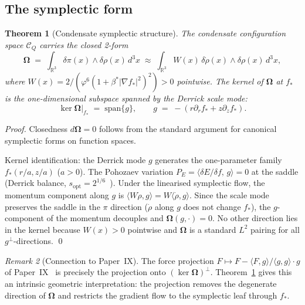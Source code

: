 \documentclass[11pt,a4paper]{article}
\newtheorem{theorem}{Theorem}[section]
\theoremstyle{definition}
\theoremstyle{remark}
\newtheorem{remark}[theorem]{Remark}
\newcommand{\vp}{\varphi}
\newcommand{\bst}{\beta^{*}}
\newcommand{\sopt}{s_{\mathrm{opt}}}
\newcommand{\RR}{\mathbb{R}}
\newcommand{\CQ}{\mathcal{C}_Q}
\newcommand{\bOmega}{\boldsymbol{\Omega}}
\begin{document}
\subsection{The symplectic form}

\begin{theorem}[Condensate symplectic structure]
\label{P10:thm:symplectic}
The condensate configuration space $\CQ$ carries the closed 2-form
\begin{equation}
  \bOmega
  \;=\; \int_{\RR^3} \delta\pi(x)\wedge\delta\rho(x)\,d^3x
  \;\approx\; \int_{\RR^3} W(x)\,\delta\dot\rho(x)\wedge\delta\rho(x)\,d^3x,
  \label{P10:eq:symplectic}
\end{equation}
where $W(x) = 2/(\vp^6(1+\bst|\nabla f_*|^2)^2)>0$ pointwise.
The kernel of $\bOmega$ at $f_*$ is the one-dimensional
subspace spanned by the Derrick scale mode:
\begin{equation}
  \ker\bOmega\big|_{f_*}
  \;=\; \mathrm{span}\bigl\{g\bigr\},
  \qquad
  g \;=\; -(r\partial_r f_* + z\partial_z f_*).
  \label{P10:eq:kernel}
\end{equation}
\end{theorem}

\begin{proof}
Closedness $d\bOmega=0$ follows from the standard argument for
canonical symplectic forms on function spaces.

Kernel identification: the Derrick mode $g$ generates the one-parameter
family $f_*(r/a, z/a)$ ($a>0$).
The Pohozaev variation $P_{E} = \langle\delta E/\delta f,\,g\rangle = 0$
at the saddle (Derrick balance, $\sopt=2^{1/6}$~\cite{Paper9}).
Under the linearised symplectic flow, the momentum component along $g$ is
$\langle W\dot\rho, g\rangle = W\langle\dot\rho, g\rangle$.
Since the scale mode preserves the saddle in the $\pi$ direction
($\dot\rho$ along $g$ does not change $f_*$), the $g$-component
of the momentum decouples and $\bOmega(g,\cdot)=0$.
No other direction lies in the kernel because $W(x)>0$ pointwise
and $\bOmega$ is a standard $L^2$ pairing for all
$g^\perp$-directions.
\qed
\end{proof}

\begin{remark}[Connection to Paper~IX]
\label{P10:rem:connection_paper9}
The force projection $F\mapsto F - \langle F,g\rangle/\langle g,g\rangle\cdot g$
of Paper~IX~\cite{Paper9} is precisely the projection onto
$(\ker\bOmega)^\perp$.
Theorem~\ref{P10:thm:symplectic} gives this an intrinsic geometric
interpretation: the projection removes the degenerate direction of
$\bOmega$ and restricts the gradient flow to the symplectic
leaf through $f_*$.
\end{remark}
\end{document}
